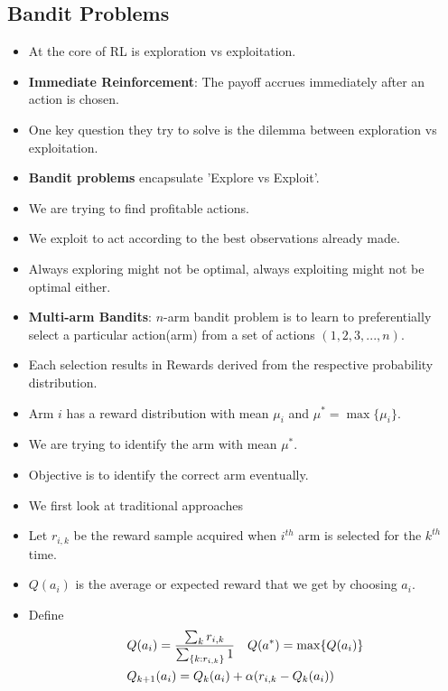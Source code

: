 \documentclass[a4paper]{article}
\begin{document}
\subsection{Bandit Problems}
\begin{itemize}
    \item At the core of RL is exploration vs exploitation.
    \item \textbf{Immediate Reinforcement}: The payoff accrues immediately after an action is chosen.
    \item One key question they try to solve is the dilemma between exploration vs exploitation.
    \item \textbf{Bandit problems} encapsulate 'Explore vs Exploit'.
    \item We are trying to find profitable actions.
    \item We exploit to act according to the best observations already made.
    \item Always exploring might not be optimal, always exploiting might not be optimal either. 
    \item \textbf{Multi-arm Bandits}: $n$-arm bandit problem is to learn to preferentially select a particular action(arm) from a set of actions $(1,2,3,...,n)$.
    \item Each selection results in Rewards derived from the respective probability distribution.
    \item Arm $i$ has a reward distribution with mean $\mu_i$ and $\mu^*=\max\{\mu_i\}$.
    \item We are trying to identify the arm with mean $\mu^*$.
    \item Objective is to identify the correct arm eventually.
    \item We first look at traditional approaches
    \item Let $r_{i,k}$ be the reward sample acquired when $i^{th}$ arm is selected for the $k^{th}$ time.
    \item $Q(a_i)$ is the average or expected reward that we get by choosing $a_i$.
    \item Define
    \begin{equation*}
        \begin{split}
            &Q(a_i)=\frac{\sum_kr_{i,k}}{\sum_{\{k:r_{i,k}\}}1}\text{\quad}Q(a^*)=\max\{Q(a_i)\}\\
            &Q_{k+1}(a_i)=Q_k(a_i)+\alpha (r_{i,k}-Q_k(a_i))
        \end{split}
    \end{equation*}

\end{itemize}
\end{document}
